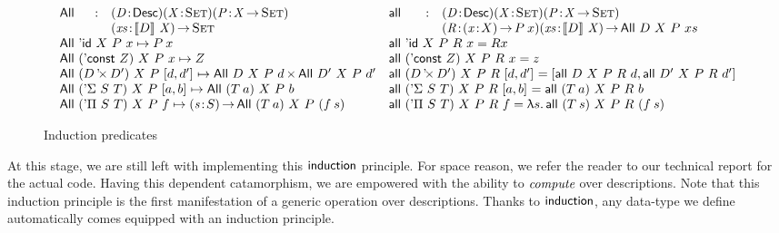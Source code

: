 \begin{figure*}

\[
\begin{array}{ll}
\stk{
\begin{array}{@{}ll}
\All{}{}{}{} : & \PITEL{\V{D}}{\Desc}
                 \PITEL{\V{X}}{\Set}
                 \PITEL{\V{P}}{\V{X} \To \Set} \\
               & \PI{\V{xs}}{\descop{D}{\V{X}}} 
                 \Set 
\end{array} \\
\All{\DId}{X}{P}{x} \mapsto P\: x \\
\All{(\DConst{Z})}{X}{P}{x} \mapsto Z \\
\All{(\DProd{D}{D'})}{X}{P}{\pair{d}{d'}{}} \mapsto \TIMES{\All{D}{X}{P}{d}}{\All{D'}{X}{P}{d'}} \\
\All{(\DSigma{S}{T})}{X}{P}{\pair{a}{b}{}} \mapsto \All{(T\: a)}{X}{P}{b} \\
\All{(\DPi{S}{T})}{X}{P}{f} \mapsto \PI{\V{s}}{S} \All{(T\: a)}{X}{P}{(f\: s)}
}
&
\stk{
\begin{array}{@{}ll}
\all{}{}{}{}{} : & \PITEL{\V{D}}{\Desc}
                   \PITEL{\V{X}}{\Set}
                   \PITEL{\V{P}}{\V{X} \To \Set} \\
                 & \PITEL{\V{R}}{\PI{\V{x}}{X} P\: x}
                   \PI{\V{xs}}{\descop{D}{\V{X}}} 
                   \All{D}{X}{P}{xs} 
\end{array} \\
\all{\DId}{X}{P}{R}{x} = R x \\
\all{(\DConst{Z})}{X}{P}{R}{x} = z \\
\all{(\DProd{D}{D'})}{X}{P}{R}{\pair{d}{d'}{}} = \pair{\all{D}{X}{P}{R}{d}}{\all{D'}{X}{P}{R}{d'}}{} \\
\all{(\DSigma{S}{T})}{X}{P}{R}{\pair{a}{b}{}} = \all{(T\: a)}{X}{P}{R}{b} \\
\all{(\DPi{S}{T})}{X}{P}{R}{f} = \LAM{s} \all{(T\: s)}{X}{P}{R}{(f\: s)}
\end{array}
}
\]

\caption{Induction predicates}
\label{fig:all-predicates}

\end{figure*}

At this stage, we are still left with implementing this
$\F{induction}$ principle. For space reason, we refer the reader to
our technical report for the actual code. Having this dependent
catamorphism, we are empowered with the ability to $\emph{compute}$
over descriptions. Note that this induction principle is the first
manifestation of a generic operation over descriptions. Thanks to
$\F{induction}$, any data-type we define automatically comes equipped
with an induction principle.


